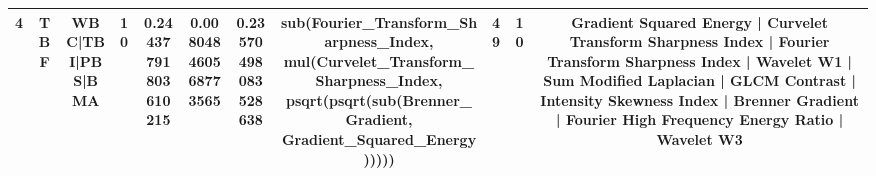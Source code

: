 \begin{table}[t]
\begin{tabular}{lcccccccccc}
4 & TBF & WBC|TBI|PBS|BMA & 10 & 0.24437791803610215 & 0.008048460568773565 & 0.23570498083528638 & sub(Fourier\_Transform\_Sharpness\_Index, mul(Curvelet\_Transform\_Sharpness\_Index, psqrt(psqrt(sub(Brenner\_Gradient, Gradient\_Squared\_Energy))))) & 49 & 10 & Gradient Squared Energy | Curvelet Transform Sharpness Index | Fourier Transform Sharpness Index | Wavelet W1 | Sum Modified Laplacian | GLCM Contrast | Intensity Skewness Index | Brenner Gradient | Fourier High Frequency Energy Ratio | Wavelet W3 \\
\hline
\end{tabular}
\end{table}